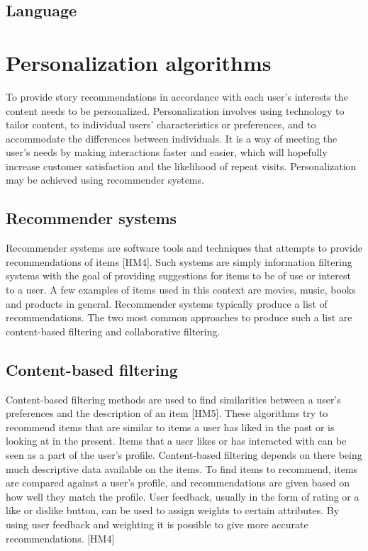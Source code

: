 \subsection{Language}

\section{Personalization algorithms}
\label{sec:personalization_algorithms}

To provide story recommendations in accordance with each user’s interests the content needs to be personalized. Personalization involves using technology to tailor content, to individual users’ characteristics or preferences, and to accommodate the differences between individuals. It is a way of meeting the user’s needs by making interactions faster and easier, which will hopefully increase customer satisfaction and the likelihood of repeat visits. Personalization may be achieved using recommender systems.

\subsection{Recommender systems}

Recommender systems are software tools and techniques that attempts to provide recommendations of items [HM4]. Such systems are simply information filtering systems with the goal of providing suggestions for items to be of use or interest to a user. A few examples of items used in this context are movies, music, books and products in general. Recommender systems typically produce a list of recommendations.  The two most common approaches to produce such a list are content-based filtering and collaborative filtering.

\subsection{Content-based filtering}

Content-based filtering methods are used to find similarities between a user’s preferences and the description of an item [HM5]. These algorithms try to recommend items that are similar to items a user has liked in the past or is looking at in the present. Items that a user likes or has interacted with can be seen as a part of the user’s profile. Content-based filtering depends on there being much descriptive data available on the items. To find items to recommend, items are compared against a user’s profile, and recommendations are given based on how well they match the profile. User feedback, usually in the form of rating or a like or dislike button, can be used to assign weights to certain attributes. By using user feedback and weighting it is possible to give more accurate recommendations. [HM4]


